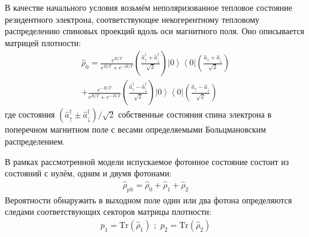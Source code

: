 \documentclass[11pt]{article}    %
\numberwithin{equation}{section}
\begin{document}
В качестве начального условия возьмём неполяризованное тепловое
состояние резидентного электрона, соответствующее некогерентному
тепловому распределению спиновых проекций вдоль оси магнитного
поля. Оно описывается матрицей плотности:
\begin{gather}
    \hat{\rho}_0 = \frac{e^{B/T}}{e^{B/T} + e^{-B/T}} \left( \frac{\hat{a}^{\dag}_{\uparrow} + \hat{a}^{\dag}_{\downarrow}}{\sqrt{2}} \right) \left| 0 \right\rangle\!\left\langle 0 \right| \left( \frac{\hat{a}_{\uparrow} + \hat{a}_{\downarrow}}{\sqrt{2}} \right) \\ \nonumber
    + \frac{e^{-B/T}}{e^{B/T} + e^{-B/T}} \left( \frac{\hat{a}^{\dag}_{\uparrow} - \hat{a}^{\dag}_{\downarrow}}{\sqrt{2}} \right) \left| 0 \right\rangle\!\left\langle 0 \right| \left( \frac{\hat{a}_{\uparrow} - \hat{a}_{\downarrow}}{\sqrt{2}} \right)
    \label{eq:rho_init}
\end{gather}
где состояния $(\hat{a}^{\dag}_{\uparrow} \pm \hat{a}^{\dag}_{\downarrow})/\sqrt{2}$
собственные состояния спина электрона в поперечном магнитном поле
с весами определяемыми Больцмановским распределением.

В рамках рассмотренной модели испускаемое фотонное состояние состоит из
состояний с нулём, одним и двумя фотонами:
\begin{gather}
    \hat{\rho}_{ph} = \hat{\rho}_{0} + \hat{\rho}_{1} + \hat{\rho}_{2}
\end{gather}
Вероятности обнаружить в выходном поле один или два фотона определяются
следами соответствующих секторов матрицы плотности:
\begin{gather}
    p_1 = \mathrm{Tr}\left( \hat{\rho}_{1} \right) \, \, ; \, \, p_2 = \mathrm{Tr}\left( \hat{\rho}_{2} \right)
\end{gather}
\end{document}
